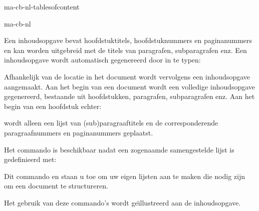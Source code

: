 \startonderdeel ma-cb-nl-tablesofcontent

\produkt ma-cb-nl




Een inhoudsopgave bevat hoofdstuktitels, hoofdstuknummers en
paginanummers en kan worden uitgebreid met de titels van
paragrafen, subparagrafen enz. Een inhoudsopgave wordt
automatisch gegenereerd door in te typen:

\starttypen
\plaatsinhoud
\stoptypen

Afhankelijk van de locatie in het document wordt vervolgens
een inhoudsopgave aangemaakt. Aan het begin van een document
wordt een volledige inhoudsopgave gegenereerd, bestaande uit
hoofdstukken, paragrafen, subparagrafen enz.
Aan het begin van een hoofdstuk echter:

\startbuffer
{}

\plaatsinhoud


\stopbuffer

\typebuffer

wordt alleen een lijst van (sub)paragraaftitels en de
corresponderende paragraafnummers en paginanummers geplaatst.

Het commando \type{\plaatsinhoud} is beschikbaar nadat een
zogenaamde samengestelde lijst is gedefinieerd met:


Dit commando en  staan u toe om uw
eigen lijsten aan te maken die nodig zijn om een document te
structureren.

Het gebruik van deze commando's wordt ge\"{\i}llustreerd aan de
inhoudsopgave.

\startbuffer
{}
\stellijstin
   [hoofdstuk]
   [voor=\blanko,
    na=\blanko,
    letter=vet]

\stellijstin
   [paragraaf]
   [variant=d]
\stopbuffer

\typebuffer

